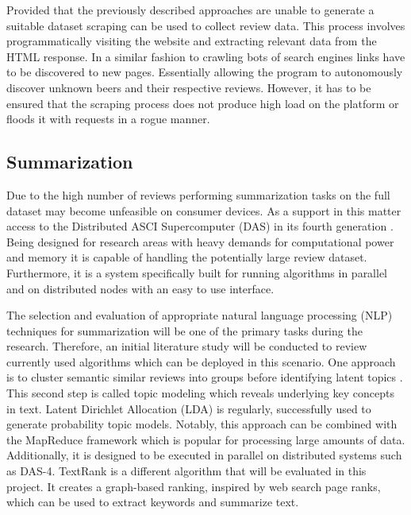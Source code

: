 Provided that the previously described approaches are unable to generate a suitable dataset scraping can be used to collect review data.
This process involves programmatically visiting the website and extracting relevant data from the HTML response.
In a similar fashion to crawling bots of search engines links have to be discovered to new pages.
Essentially allowing the program to autonomously discover unknown beers and their respective reviews.
However, it has to be ensured that the scraping process does not produce high load on the platform or floods it with requests in a rogue manner.

\subsection{Summarization}
Due to the high number of reviews performing summarization tasks on the full dataset may become unfeasible on consumer devices.
As a support in this matter access to the Distributed ASCI Supercomputer (DAS) in its fourth generation \cite{Bal2016}.
Being designed for research areas with heavy demands for computational power and memory it is capable of handling the potentially large review dataset.
Furthermore, it is a system specifically built for running algorithms in parallel and on distributed nodes with an easy to use interface.

The selection and evaluation of appropriate natural language processing (NLP) techniques for summarization will be one of the primary tasks during the research.
Therefore, an initial literature study will be conducted to review currently used algorithms which can be deployed in this scenario.
One approach is to cluster semantic similar reviews into groups before identifying latent topics \cite{Nagwani2015}.
This second step is called topic modeling which reveals underlying key concepts in text.
Latent Dirichlet Allocation (LDA) \cite{Blei2003} is regularly, successfully \cite{Nagwani2015, Ren2013} used to generate probability topic models.
Notably, this approach can be combined with the MapReduce framework \cite{Nagwani2015} which is popular for processing large amounts of data.
Additionally, it is designed to be executed in parallel on distributed systems such as DAS-4.
TextRank \cite{Mihalcea2004} is a different algorithm that will be evaluated in this project.
It creates a graph-based ranking, inspired by web search page ranks, which can be used to extract keywords and summarize text.

